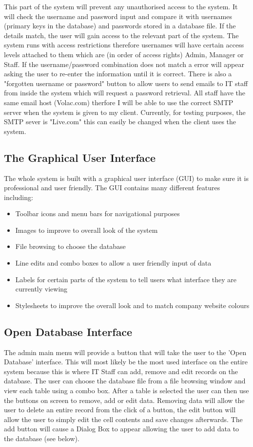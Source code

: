 This part of the system will prevent any unauthorised access to the system. It will check the username and password input and compare it with usernames (primary keys in the database) and passwords stored in a database file. If the details match, the user will gain access to the relevant part of the system. The system runs with access restrictions therefore usernames will have certain access levels attached to them which are (in order of access rights) Admin, Manager or Staff. If the username/password combination does not match a error will appear asking the user to re-enter the information until it is correct. There is also a "forgotten username or password" button to allow users to send emails to IT staff from inside the system which will request a password retrieval. All staff have the same email host (Volac.com) therfore I will be able to use the correct SMTP server when the system is given to my client. Currently, for testing purposes, the SMTP sever is "Live.com" this can easily be changed when the client uses the system.

\subsection{The Graphical User Interface}

The whole system is built with a graphical user interface (GUI) to make sure it is professional and user friendly. The GUI contains many different features including:
\begin{itemize}
\item Toolbar icons and menu bars for navigational purposes
\item Images to improve to overall look of the system
\item File browsing to choose the database
\item Line edits and combo boxes to allow a user friendly input of data
\item Labels for certain parts of the system to tell users what interface they are currently viewing
\item Stylesheets to improve the overall look and to match company website colours
\end{itemize}

\subsection{Open Database Interface}

The admin main menu will provide a button that will take the user to the 'Open Database' interface. This will most likely be the most used interface on the entire system because this is where IT Staff can add, remove and edit records on the database. The user can choose the database file from a file browsing window and view each table using a combo box. After a table is selected the user can then use the buttons on screen to remove, add or edit data. Removing data will allow the user to delete an entire record from the click of a button, the edit button will allow the user to simply edit the cell contents and save changes afterwards. The add button will cause a Dialog Box to appear allowing the user to add data to the database (see below).

